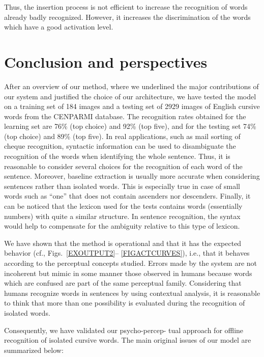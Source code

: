 \documentclass[ijdar]{svjour}
\begin{document}
Thus, the insertion process is not efficient to increase the recognition of words already badly recognized.
However, it increases the discrimination of the words which have a good activation level.

\section{Conclusion and perspectives}
\label{CONCLU}

After an overview of our method, where we underlined the major contributions of our system and justified the choice of our architecture, we have tested the model on a training set of 184 images and a testing set of 2929 images of English cursive words from the CENPARMI database.
The recognition rates obtained for the learning set are 76\% (top choice) and 92\% (top five), and for the testing set 74\% (top choice) and 89\% (top five).
In real applications, such as mail sorting of cheque recognition, syntactic information can be used to disambiguate the recognition of the words when identifying the whole sentence.
Thus, it is reasonable to consider several choices for the recognition of each word of the sentence.
Moreover, baseline extraction is usually more accurate when considering sentences rather than isolated words.
This is especially true in case of small words such as ``one'' that does not contain ascenders nor descenders.
Finally, it can be noticed that the lexicon used for the tests contains
words
(essentially numbers) with quite a similar structure.
In sentence recognition, the syntax would help to compensate for the ambiguity relative to this type of lexicon.


We have shown that the method is operational and that it has the expected behavior ({cf.},
Figs.~\ref{EXOUTPUT2}--%
\ref{FIGACTCURVES}), {i.e.}, that it behaves according to the
perceptual concepts studied.
Errors made by the system are not incoherent but mimic in some manner those observed in humans because words which are confused are part of the same perceptual family.
Considering that humans recognize words in sentences by using contextual analysis, it is reasonable to think that more than one possibility is evaluated during the recognition of isolated words.

Consequently, we have validated our psycho-percep-\break
tual approach for offline recognition of isolated cursive words.
The main original issues of our model are summarized below:
\end{document}
